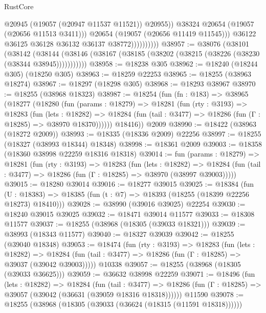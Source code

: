 \begin{lexlean}{RustCore}
\begin{coremodule}
                                @20945
                                (@19057 (@20947 @11537 @11521))
                                @20955))
                            @38324
                            @20654
                            (@19057 (@20656 @11513 @3411)))
                          @20654
                          (@19057 (@20656 @11419 @11545)))
                        @36122
                        @36125
                        @36128
                        @36132
                        @36137
                        @38772))))))))))
@38957 := @38076
    (@38101
      (@38142
        (@38144 (@38146 (@38167 (@38185 (@38202 (@38215 (@38226 (@38230 (@38344 @38945)))))))))))
@38958 := @18238 @305
@38962 := @18240 (@18244 @305) (@18250 @305)
@38963 := @18259 @22253
@38965 := @18255 (@38963 @18274)
@38967 := @18297 (@18298 @305)
@38968 := @18293 @38967
@38970 := @18255 (@38968 @18323)
@38987 := @18254
    (fun (fn : @183) =>
    @38965
      (@18277
        (@18280
          (fun (params : @18279) =>
          @18281
            (fun (rty : @3193) =>
            @18283
              (fun (lets : @18282) =>
              @18284 (fun (tail : @3477) => @18286 (fun (Γ : @18285) => @38970 @18370))))))
        @18416))
    @2009
@38990 := @18422 (@38963 (@18272 @2009))
@38993 := @18335 (@18336 @2009) @22256
@38997 := @18255 (@18327 (@38993 @18344) @18348)
@38998 := @18361 @2009
@39003 := @18358 (@18360 @38998 @22259 @18316 @18318)
@39014 := fun (params : @18279) =>
  @18281
    (fun (rty : @3193) =>
    @18283
      (fun (lets : @18282) =>
      @18284 (fun (tail : @3477) => @18286 (fun (Γ : @18285) => @38970 (@38997 @39003)))))
@39015 := @18280 @39014
@39016 := @18277 @39015
@39025 := @18384
    (fun (U : @18383) => @18385 (fun (t : @7) => @18393 (@18255 (@18399 @22256 @18273) @18410)))
@39028 := @38990 (@39016 @39025) @22254
@39030 := @18240 @39015 @39025
@39032 := @18471 @39014 @11577
@39033 := @18308 @11577
@39037 := @18255 (@38968 (@18305 (@39033 @18321)))
@39039 := @38993 (@18343 @11577)
@39040 := @18327 @39039
@39042 := @18255 (@39040 @18348)
@39053 := @18474
    (fun (rty : @3193) =>
    @18283
      (fun (lets : @18282) =>
      @18284 (fun (tail : @3477) => @18286 (fun (Γ : @18285) => @39037 (@39042 @39003)))))
    @10338
@39057 := @18255 (@38968 (@18305 (@39033 @36625)))
@39059 := @36632 @38998 @22259
@39071 := @18496
    (fun (lets : @18282) =>
    @18284
      (fun (tail : @3477) =>
      @18286 (fun (Γ : @18285) => @39057 (@39042 (@36631 (@39059 @18316 @18318))))))
    @11590
@39078 := @18255 (@38968 (@18305 (@39033 (@36624 (@18315 (@11591 @18318))))))

\end{coremodule}
\end{lexlean}
